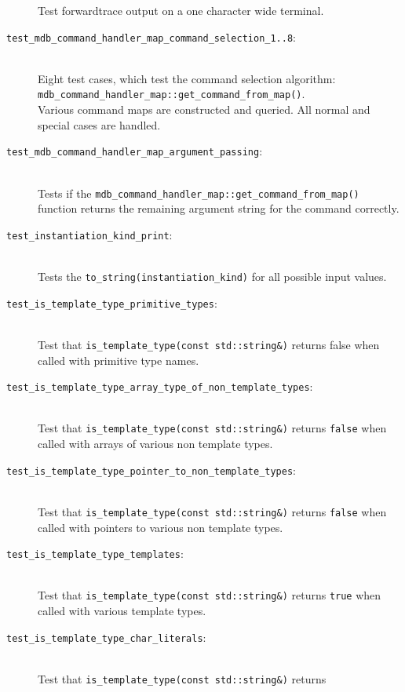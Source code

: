\begin{description}
        Test forwardtrace output on a one character wide terminal.
    \item[\texttt{test\_mdb\_command\_handler\_map\_command\_selection\_1..8}:] \hfill \\
        Eight test cases, which test the command selection algorithm: \\
        \texttt{mdb\_command\_handler\_map::get\_command\_from\_map()}. \\
        Various command maps are constructed and queried. All normal and
        special cases are handled.
    \item[\texttt{test\_mdb\_command\_handler\_map\_argument\_passing}:] \hfill \\
        Tests if the
        \texttt{mdb\_command\_handler\_map::get\_command\_from\_map()}
        function returns the remaining argument string for the command
        correctly.
    \item[\texttt{test\_instantiation\_kind\_print}:] \hfill \\
        Tests the \texttt{to\_string(instantiation\_kind)} for all possible
        input values.
    \item[\texttt{test\_is\_template\_type\_primitive\_types}:] \hfill \\
        Test that \texttt{is\_template\_type(const std::string\&)} returns
        false when called with primitive type names.
    \item[\texttt{test\_is\_template\_type\_array\_type\_of\_non\_template\_types}:] \hfill \\
        Test that \texttt{is\_template\_type(const std::string\&)} returns
        \texttt{false} when called with arrays of various non template types.
    \item[\texttt{test\_is\_template\_type\_pointer\_to\_non\_template\_types}:] \hfill \\
        Test that \texttt{is\_template\_type(const std::string\&)} returns
        \texttt{false} when called with pointers to various non template types.
    \item[\texttt{test\_is\_template\_type\_templates}:] \hfill \\
        Test that \texttt{is\_template\_type(const std::string\&)} returns
        \texttt{true} when called with various template types.
    \item[\texttt{test\_is\_template\_type\_char\_literals}:] \hfill \\
        Test that \texttt{is\_template\_type(const std::string\&)} returns

\end{description}
